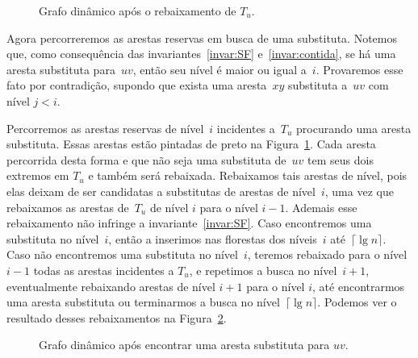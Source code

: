 \begin{figure}[htb]
\centering
\caption{Grafo dinâmico após o rebaixamento de $T_u$.}
\label{fig:DG-depois-de-rebaixar}
\end{figure}

Agora percorreremos as arestas reservas em busca de uma substituta.
Notemos que, como consequência das invariantes~\ref{invar:SF} e~\ref{invar:contida}, se há uma aresta substituta para~$uv$, então seu nível é maior ou igual a~$i$.
Provaremos esse fato por contradição, supondo que exista uma aresta~$xy$ substituta a~$uv$ com nível $j<i$.

Percorremos as arestas reservas de nível~$i$ incidentes a~$T_u$ procurando uma aresta substituta. Essas arestas estão pintadas de preto na Figura~\ref{fig:DG-depois-de-rebaixar}. Cada aresta percorrida desta forma e que não seja uma substituta de~$uv$ tem seus dois extremos em $T_u$ e também será rebaixada.
Rebaixamos tais arestas de nível, pois elas deixam de ser candidatas a substitutas de arestas de nível~$i$, uma vez que rebaixamos as arestas de~$T_u$ de nível $i$ para o nível $i-1$. 
Ademais esse rebaixamento não infringe a invariante~\ref{invar:SF}.
Caso encontremos uma substituta no nível~$i$, então a inserimos nas florestas dos níveis~$i$ até~$\lceil \lg n \rceil$. Caso não encontremos uma substituta no nível~$i$, teremos rebaixado para o nível $i-1$ todas as arestas incidentes a $T_u$, e repetimos a busca no nível~$i+1$, eventualmente rebaixando arestas de nível $i+1$ para o nível $i$, até encontrarmos uma aresta substituta ou terminarmos a busca no nível~$\lceil \lg n \rceil$. Podemos ver o resultado desses rebaixamentos na Figura~\ref{fig:DG-depois-achou-sub}.
\begin{figure}[htb]
\centering
\caption{Grafo dinâmico após encontrar uma aresta substituta para $uv$.}
\label{fig:DG-depois-achou-sub}
\end{figure}

